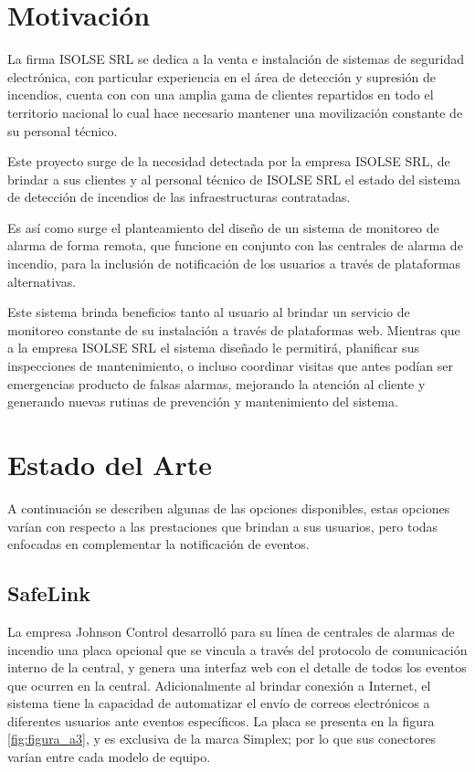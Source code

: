 \section{Motivación}

La firma ISOLSE SRL se dedica a la venta e instalación de sistemas de seguridad electrónica, con particular experiencia en el área de detección y supresión de incendios, cuenta con con una amplia gama de clientes repartidos en todo el territorio nacional lo cual hace necesario mantener una movilización constante de su personal técnico. 

Este proyecto surge de la necesidad detectada por la empresa ISOLSE SRL, de brindar a sus clientes y al personal técnico de ISOLSE SRL el estado del sistema de detección de incendios de las infraestructuras contratadas.

Es así como surge el planteamiento del diseño de un sistema de monitoreo de alarma de forma remota, que funcione en conjunto con las centrales de alarma de incendio, para la  inclusión de notificación de los usuarios a través de plataformas alternativas.

Este sistema brinda beneficios tanto al usuario al brindar un servicio de monitoreo constante de su instalación a través de plataformas web.  Mientras que a la empresa ISOLSE SRL el sistema diseñado le permitirá, planificar sus inspecciones de mantenimiento, o incluso coordinar visitas que antes podían ser emergencias producto de falsas alarmas, mejorando la atención al cliente y generando nuevas rutinas de prevención y mantenimiento del sistema.


\section{Estado del Arte}

A continuación se describen algunas de las opciones disponibles, estas opciones varían con respecto a las prestaciones que brindan a sus usuarios, pero todas enfocadas en complementar la notificación de eventos. 

\subsection{SafeLink}

La empresa Johnson Control desarrolló para su línea de centrales de alarmas de incendio una placa opcional que se vincula a través del protocolo de comunicación interno de la central, y genera una interfaz web con el detalle de todos los eventos que ocurren en la central. Adicionalmente al brindar conexión a Internet, el sistema tiene la capacidad de automatizar el envío de correos electrónicos a diferentes usuarios ante eventos específicos. La placa se presenta en la figura \ref{fig:figura_a3}, y es exclusiva de la marca Simplex; por lo que sus conectores varían entre cada modelo de equipo.

